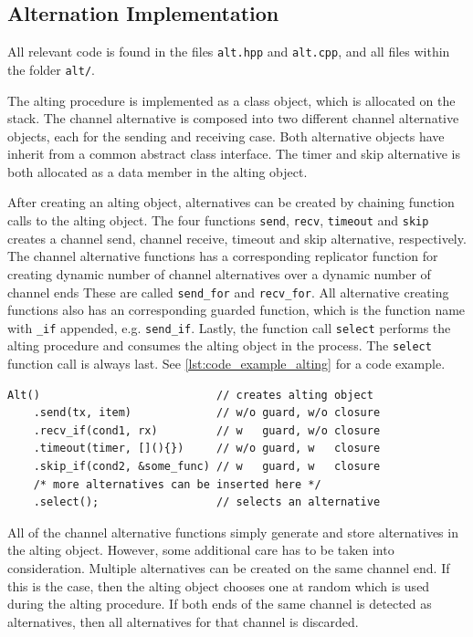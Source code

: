 \subsection{Alternation Implementation}
\label{subsec:alternation_implementation}

All relevant code is found in the files \texttt{alt.hpp} and \texttt{alt.cpp}, and all files within the folder \texttt{alt/}.

The alting procedure is implemented as a class object, which is allocated on the stack. The channel alternative is composed into two different channel alternative objects, each for the sending and receiving case. Both alternative objects have inherit from a common abstract class interface. The timer and skip alternative is both allocated as a data member in the alting object. 

After creating an alting object, alternatives can be created by chaining function calls to the alting object. The four functions \texttt{send}, \texttt{recv}, \texttt{timeout} and \texttt{skip} creates a channel send, channel receive, timeout and skip alternative, respectively. The channel alternative functions has a corresponding replicator function for creating dynamic number of channel alternatives over a dynamic number of channel ends These are called \texttt{send\_for} and \texttt{recv\_for}. All alternative creating functions also has an corresponding guarded function, which is the function name with \texttt{\_if} appended, e.g. \texttt{send\_if}. Lastly, the function call \texttt{select} performs the alting procedure and consumes the alting object in the process. The \texttt{select} function call is always last. See \cref{lst:code_example_alting} for a code example.

\begin{lstfloat}
\begin{lstlisting}[caption={Code example of alting.}, label={lst:code_example_alting}, style={CustomC++}]
Alt()                           // creates alting object
    .send(tx, item)             // w/o guard, w/o closure
    .recv_if(cond1, rx)         // w   guard, w/o closure
    .timeout(timer, [](){})     // w/o guard, w   closure
    .skip_if(cond2, &some_func) // w   guard, w   closure
    /* more alternatives can be inserted here */
    .select();                  // selects an alternative
\end{lstlisting}
\end{lstfloat}

All of the channel alternative functions simply generate and store alternatives in the alting object. However, some additional care has to be taken into consideration. Multiple alternatives can be created on the same channel end. If this is the case, then the alting object chooses one at random which is used during the alting procedure. If both ends of the same channel is detected as alternatives, then all alternatives for that channel is discarded.

